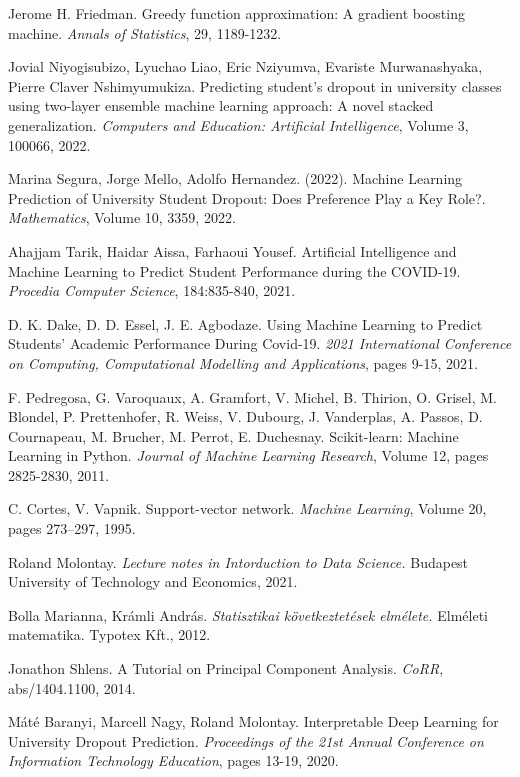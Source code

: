 \documentclass[12pt]{article}
\begin{document}
\newpage
\begin{thebibliography}{9}
Jerome H. Friedman. Greedy function approximation: A gradient boosting machine. 
\textit{Annals of Statistics}, 29, 1189-1232.

Jovial Niyogisubizo, Lyuchao Liao, Eric Nziyumva, Evariste Murwanashyaka, Pierre Claver Nshimyumukiza.
Predicting student's dropout in university classes using two-layer ensemble machine learning approach: A novel stacked generalization.
\textit{Computers and Education: Artificial Intelligence}, Volume 3, 100066, 2022.

Marina Segura, Jorge Mello, Adolfo Hernandez. (2022). Machine Learning Prediction of University Student Dropout: Does Preference Play a Key Role?. \textit{Mathematics}, Volume 10, 3359, 2022.

Ahajjam Tarik, Haidar Aissa, Farhaoui Yousef. Artificial Intelligence and Machine Learning to Predict Student Performance during the COVID-19. \textit{Procedia Computer Science}, 184:835-840, 2021.

D. K. Dake, D. D. Essel, J. E. Agbodaze. Using Machine Learning to Predict Students' Academic Performance During Covid-19. \textit{2021 International Conference on Computing, Computational Modelling and Applications}, pages 9-15, 2021.

 F. Pedregosa, G. Varoquaux, A. Gramfort, V. Michel, B. Thirion, O. Grisel, M. Blondel, P. Prettenhofer, R. Weiss, V. Dubourg, J. Vanderplas, A. Passos, D. Cournapeau, M. Brucher, M. Perrot, E. Duchesnay. Scikit-learn: Machine Learning in Python. \textit{Journal of Machine Learning Research}, Volume 12, pages 2825-2830, 2011.

 C. Cortes, V. Vapnik. Support-vector network. \textit{Machine Learning}, Volume 20, pages 273–297, 1995.

 Roland Molontay. \textit{Lecture notes in Intorduction to Data Science.} Budapest University of Technology and Economics, 2021.

 Bolla Marianna, Krámli András.  \textit{Statisztikai következtetések elmélete.}  Elméleti matematika. Typotex Kft., 2012.

Jonathon Shlens. A Tutorial on Principal Component Analysis. \textit{CoRR}, abs/1404.1100, 2014.

Máté Baranyi, Marcell Nagy, Roland Molontay. Interpretable Deep Learning for University Dropout Prediction. \textit{Proceedings of the 21st Annual Conference on Information Technology Education}, pages 13-19, 2020.


\end{thebibliography}
\end{document}
